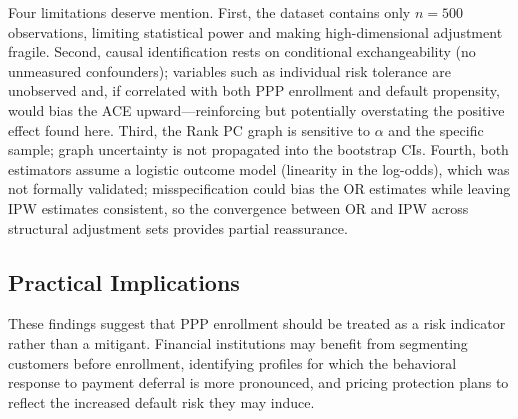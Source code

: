 \documentclass[11pt, a4paper]{article}
\theoremstyle{definition}
\begin{document}
Four limitations deserve mention. First, the dataset contains only $n = 500$ observations,
limiting statistical power and making high-dimensional adjustment fragile. Second, causal
identification rests on conditional exchangeability (no unmeasured confounders); variables
such as individual risk tolerance are unobserved and, if correlated with both PPP enrollment
and default propensity, would bias the ACE upward---reinforcing but potentially
overstating the positive effect found here. Third, the Rank PC graph is sensitive to
$\alpha$ and the specific sample; graph uncertainty is not propagated into the bootstrap
CIs. Fourth, both estimators assume a logistic outcome model (linearity in the log-odds),
which was not formally validated; misspecification could bias the OR estimates while leaving
IPW estimates consistent, so the convergence between OR and IPW across structural adjustment
sets provides partial reassurance.

\subsection{Practical Implications}

These findings suggest that PPP enrollment should be treated as a risk indicator rather than
a mitigant. Financial institutions may benefit from segmenting customers before enrollment,
identifying profiles for which the behavioral response to payment deferral is more
pronounced, and pricing protection plans to reflect the increased default risk they may
induce.



\end{document}
